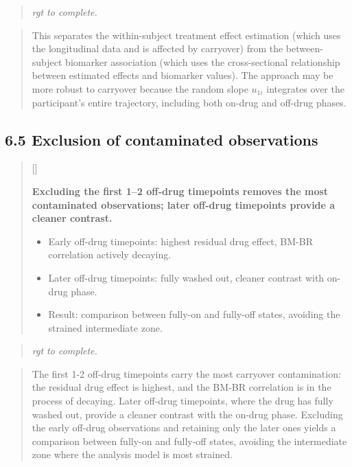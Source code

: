 \documentclass[
  11pt,
]{article}
\newcounter{pgraph}
\newenvironment{bullets}{%
  \stepcounter{pgraph}%
  \begin{quote}\small\sffamily\color[gray]{0.30}%
  {\normalfont\scriptsize\color[gray]{0.58}[\thepgraph]\enspace}}{%
  \end{quote}}
\newenvironment{rgt}{%
  \begin{quote}\small\itshape\color[RGB]{20,60,160}}{%
  \end{quote}}
\newenvironment{orig}{%
  \begin{quote}\normalsize\color[gray]{0.55}}{%
  \end{quote}}
\begin{document}
\begin{rgt}
rgt to complete.

\end{rgt}

\begin{orig}
This separates the within-subject treatment effect estimation (which
uses the longitudinal data and is affected by carryover) from the
between-subject biomarker association (which uses the cross-sectional
relationship between estimated effects and biomarker values). The
approach may be more robust to carryover because the random slope
\(u_{1i}\) integrates over the participant's entire trajectory,
including both on-drug and off-drug phases.

\end{orig}

\subsection{6.5 Exclusion of contaminated observations}

\begin{bullets}

\textbf{Excluding the first 1--2 off-drug timepoints removes
the most contaminated observations; later off-drug timepoints
provide a cleaner contrast.}

\begin{itemize}\setlength{\itemsep}{2pt}\setlength{\parskip}{0pt}
\item Early off-drug timepoints: highest residual drug effect,
  BM-BR correlation actively decaying.
\item Later off-drug timepoints: fully washed out, cleaner
  contrast with on-drug phase.
\item Result: comparison between fully-on and fully-off states,
  avoiding the strained intermediate zone.
\end{itemize}

\end{bullets}

\begin{rgt}
rgt to complete.

\end{rgt}

\begin{orig}
The first 1-2 off-drug timepoints carry the most carryover
contamination: the residual drug effect is highest, and the BM-BR
correlation is in the process of decaying. Later off-drug timepoints,
where the drug has fully washed out, provide a cleaner contrast with the
on-drug phase. Excluding the early off-drug observations and retaining
only the later ones yields a comparison between fully-on and fully-off
states, avoiding the intermediate zone where the analysis model is most
strained.

\end{orig}
\end{document}
